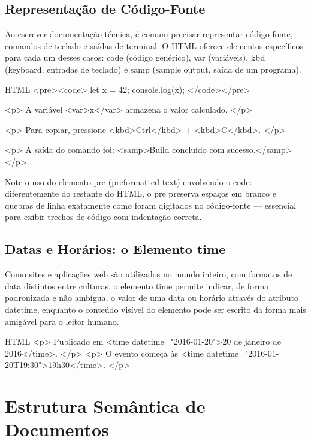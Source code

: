 \subsection{Representação de Código-Fonte}

Ao escrever documentação técnica, é comum precisar representar código-fonte, comandos de teclado e saídas de terminal. O HTML oferece elementos específicos para cada um desses casos: code (código genérico), var (variáveis), kbd (keyboard, entradas de teclado) e samp (sample output, saída de um programa).

\begin{codebox}{HTML}
<pre><code>
let x = 42;
console.log(x);
</code></pre>

<p>
  A variável <var>x</var> armazena o valor calculado.
</p>

<p>
  Para copiar, pressione <kbd>Ctrl</kbd> + <kbd>C</kbd>.
</p>

<p>
  A saída do comando foi: <samp>Build concluído com sucesso.</samp>
</p>
\end{codebox}

Note o uso do elemento pre (preformatted text) envolvendo o code: diferentemente do restante do HTML, o pre preserva espaços em branco e quebras de linha exatamente como foram digitados no código-fonte — essencial para exibir trechos de código com indentação correta.

\subsection{Datas e Horários: o Elemento time}

Como sites e aplicações web são utilizados no mundo inteiro, com formatos de data distintos entre culturas, o elemento time permite indicar, de forma padronizada e não ambígua, o valor de uma data ou horário através do atributo datetime, enquanto o conteúdo visível do elemento pode ser escrito da forma mais amigável para o leitor humano.

\begin{codebox}{HTML}
<p>
  Publicado em <time datetime="2016-01-20">20 de janeiro de 2016</time>.
</p>
<p>
  O evento começa às <time datetime="2016-01-20T19:30">19h30</time>.
</p>
\end{codebox}

\section{Estrutura Semântica de Documentos}

